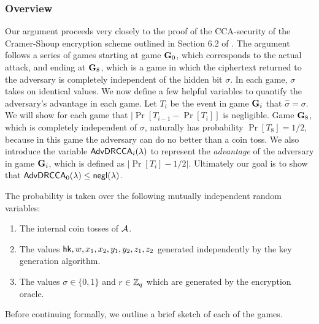 \subsubsection{Overview}

Our argument proceeds very closely to the proof of the CCA-security of the Cramer-Shoup encryption scheme outlined in Section 6.2 of \cite{cs01}. The argument follows a series of games starting at game $\mathbf{G}_0$, which corresponds to the actual attack, and ending at $\mathbf{G}_8$, which is a game in which the ciphertext returned to the adversary is completely independent of the hidden bit $\sigma$. In each game, $\sigma$ takes on identical values. We now define a few helpful variables to quantify the adversary's advantage in each game. Let $T_i$ be the event in game $\mathbf{G}_i$ that $\hat{\sigma}=\sigma$. We will show for each game that $|\Pr[T_{i-1} - \Pr[T_i]]$ is negligible. Game $\mathbf{G}_8$, which is completely independent of $\sigma$, naturally has probability $\Pr[T_8]=1/2$, because in this game the adversary can do no better than a coin toss. We also introduce the variable $\mathsf{AdvDRCCA}_i(\lambda)$ to represent the \textit{advantage} of the adversary in game $\mathbf{G}_i$, which is defined as $|\Pr[T_i]-1/2|$. Ultimately our goal is to show that $\mathsf{AdvDRCCA}_0(\lambda)\leq\mathsf{negl}(\lambda)$.

The probability is taken over the following mutually independent random variables:	\begin{enumerate}
	\item The internal coin tosses of $\mathcal{A}$.
	\item The values $\mathsf{hk},w,x_1,x_2,y_1,y_2,z_1,z_2$ generated independently by the key generation algorithm.
	\item The values $\sigma\in\{0,1\}$ and $r\in\mathbb{Z}_q$ which are generated by the encryption oracle.
\end{enumerate}

Before continuing formally, we outline a brief sketch of each of the games.

